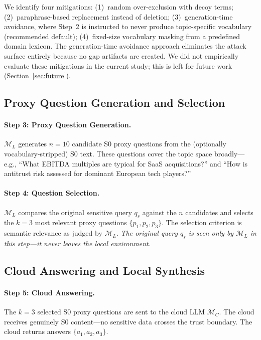 \documentclass[sigconf,anonymous,review,balance=false]{acmart}
\begin{document}
We identify four mitigations: (1)~random over-exclusion with decoy terms; (2)~paraphrase-based replacement instead of deletion; (3)~generation-time avoidance, where Step~2 is instructed to never produce topic-specific vocabulary (recommended default); (4)~fixed-size vocabulary masking from a predefined domain lexicon. The generation-time avoidance approach eliminates the attack surface entirely because no gap artifacts are created. We did not empirically evaluate these mitigations in the current study; this is left for future work (Section~\ref{sec:future}).

\subsection{Proxy Question Generation and Selection}
\label{sec:proxy-questions}

\paragraph{Step 3: Proxy Question Generation.} $\mathcal{M}_L$ generates $n = 10$ candidate S0 proxy questions from the (optionally vocabulary-stripped) S0 text. These questions cover the topic space broadly---e.g., ``What EBITDA multiples are typical for SaaS acquisitions?'' and ``How is antitrust risk assessed for dominant European tech players?''

\paragraph{Step 4: Question Selection.} $\mathcal{M}_L$ compares the original sensitive query $q_s$ against the $n$ candidates and selects the $k = 3$ most relevant proxy questions $\{p_1, p_2, p_3\}$. The selection criterion is semantic relevance as judged by $\mathcal{M}_L$. \emph{The original query $q_s$ is seen only by $\mathcal{M}_L$ in this step---it never leaves the local environment.}

\subsection{Cloud Answering and Local Synthesis}
\label{sec:synthesis}

\paragraph{Step 5: Cloud Answering.} The $k = 3$ selected S0 proxy questions are sent to the cloud LLM $\mathcal{M}_C$. The cloud receives genuinely S0 content---no sensitive data crosses the trust boundary. The cloud returns answers $\{a_1, a_2, a_3\}$.
\end{document}
